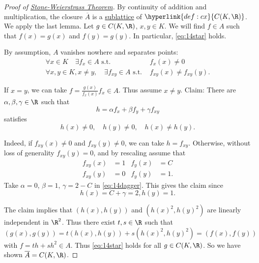 \documentclass{article}
\begin{document}
\begin{proof}[Proof of \hyperlink{thm:sw}{Stone-Weierstrass Theorem}]
    By continuity of addition and multiplication, the closure $\overline{A}$ is a \hyperlink{def:lattice}{sublattice} of $\hyperlink{def:cx}{C(K, \R)}$.
    We apply the last lemma.
    Let $g \in C(K, \R)$, $x, y \in K$. We will find $f \in A$ such that $f(x) = g(x)$ and $f(y) = g(y)$.
    In particular, \eqref{eq:14star} holds.

    By assumption, $A$ vanishes nowhere and separates points:
    \begin{align*}
        \forall x \in K \quad \exists f_x \in A \text{ s.t. } &f_x(x) \neq 0 \\
        \forall x, y \in K, x \neq y, \quad \exists f_{xy} \in A \text{ s.t. } &f_{xy}(x) \neq f_{xy}(y).
    \end{align*}

    If $x = y$, we can take $f = \frac{g(x)}{f_x(x)} f_x \in A$.
    Thus assume $x \neq y$.
    Claim: There are $\alpha, \beta, \gamma \in \R$ such that
    \begin{equation*}
        h = \alpha f_x + \beta f_y + \gamma f_{xy} \label{eq:14dagger} \tag{$\dagger$}
    \end{equation*}
    satisfies
    \begin{equation*}
        h(x) \neq 0, \quad h(y) \neq 0, \quad h(x) \neq h(y).
    \end{equation*}

    Indeed, if $f_{xy}(x) \neq 0$ and $f_{xy}(y) \neq 0$, we can take $h = f_{xy}$.
    Otherwise, without loss of generality $f_{xy}(y) = 0$, and by rescaling assume that
    \begin{align*}
        f_{xy}(x) &= 1 & f_y(x) &= C \\
        f_{xy}(y) &= 0 & f_y(y) &= 1.
    \end{align*}
    Take $\alpha = 0$, $\beta=1$, $\gamma=2-C$ in \eqref{eq:14dagger}.
    This gives the claim since
    \begin{equation*}
        h(x) = C + \gamma = 2, h(y) = 1.
    \end{equation*}

    The claim implies that $(h(x), h(y))$ and $(h(x)^2, h(y)^2)$ are linearly independent in $\R^2$.
    Thus there exist $t, s \in \R$ such that
    \begin{equation*}
        (g(x), g(y)) = t(h(x), h(y)) + s(h(x)^2, h(y)^2) = (f(x), f(y))
    \end{equation*}
    with $f = th + sh^2 \in A$.
    Thus \eqref{eq:14star} holds for all $g \in C(K, \R)$.
    So we have shown $\overline{A} = C(K, \R)$.
\end{proof}
\end{document}
